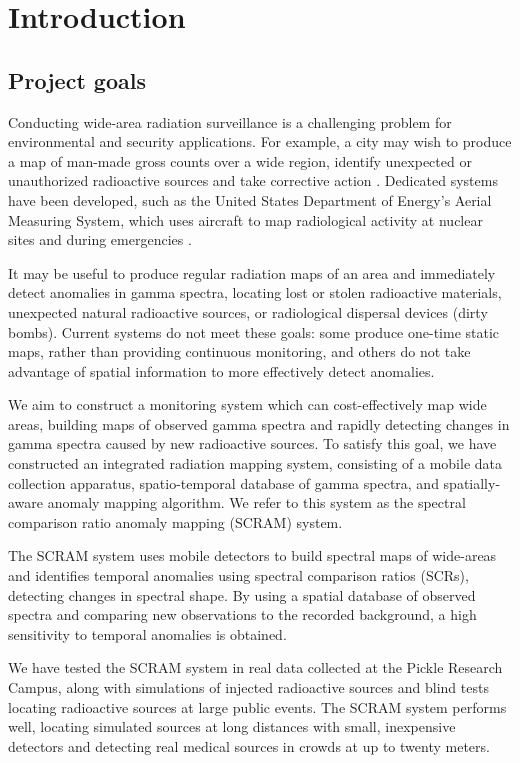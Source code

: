 \chapter{Introduction}

\section{Project goals}

Conducting wide-area radiation surveillance is a challenging problem for
environmental and security applications. For example, a city may wish to produce
a map of man-made gross counts over a wide region, identify
unexpected or unauthorized radioactive sources and take corrective action
\cite{Wasiolek:2007vn}. Dedicated systems have been developed, such as the
United States Department of Energy's Aerial Measuring System, which uses
aircraft to map radiological activity at nuclear sites and during emergencies
\cite{Jobst}.

It may be useful to produce regular radiation maps of an area and immediately
detect anomalies in gamma spectra, locating lost or stolen radioactive
materials, unexpected natural radioactive sources, or radiological dispersal
devices (dirty bombs). Current systems do not meet these goals: some produce
one-time static maps, rather than providing continuous monitoring, and others do
not take advantage of spatial information to more effectively detect anomalies.

We aim to construct a monitoring system which can cost-effectively map wide
areas, building maps of observed gamma spectra and rapidly detecting changes in
gamma spectra caused by new radioactive sources. To satisfy this goal, we have
constructed an integrated radiation mapping system, consisting of a mobile data
collection apparatus, spatio-temporal database of gamma spectra, and
spatially-aware anomaly mapping algorithm. We refer to this system as the
spectral comparison ratio anomaly mapping (SCRAM) system.

The SCRAM system uses mobile detectors to build spectral maps of wide-areas and
identifies temporal anomalies using spectral comparison ratios (SCRs), detecting
changes in spectral shape. By using a spatial database of observed spectra and
comparing new observations to the recorded background, a high sensitivity to
temporal anomalies is obtained.

We have tested the SCRAM system in real data collected at the Pickle Research
Campus, along with simulations of injected radioactive sources and blind tests
locating radioactive sources at large public events. The SCRAM system performs
well, locating simulated sources at long distances with small, inexpensive
detectors and detecting real medical sources in crowds at up to twenty meters.

